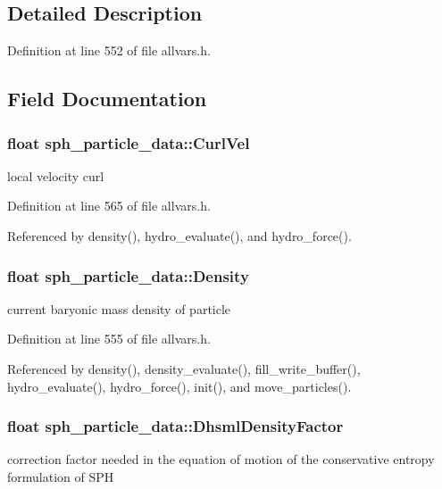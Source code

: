 \subsection{Detailed Description}


Definition at line 552 of file allvars.h.



\subsection{Field Documentation}
\hypertarget{structsph__particle__data_a843c827a50c8783218cd850925deb575}{
\subsubsection[{CurlVel}]{\setlength{\rightskip}{0pt plus 5cm}float {\bf sph\_\-particle\_\-data::CurlVel}}}
\label{structsph__particle__data_a843c827a50c8783218cd850925deb575}
local velocity curl 

Definition at line 565 of file allvars.h.



Referenced by density(), hydro\_\-evaluate(), and hydro\_\-force().

\hypertarget{structsph__particle__data_aaeca7f3efec44ebd5b7d36ce79d38779}{
\subsubsection[{Density}]{\setlength{\rightskip}{0pt plus 5cm}float {\bf sph\_\-particle\_\-data::Density}}}
\label{structsph__particle__data_aaeca7f3efec44ebd5b7d36ce79d38779}
current baryonic mass density of particle 

Definition at line 555 of file allvars.h.



Referenced by density(), density\_\-evaluate(), fill\_\-write\_\-buffer(), hydro\_\-evaluate(), hydro\_\-force(), init(), and move\_\-particles().

\hypertarget{structsph__particle__data_af49cca403dc402fdb0d0d481d49d7b53}{
\subsubsection[{DhsmlDensityFactor}]{\setlength{\rightskip}{0pt plus 5cm}float {\bf sph\_\-particle\_\-data::DhsmlDensityFactor}}}
\label{structsph__particle__data_af49cca403dc402fdb0d0d481d49d7b53}
correction factor needed in the equation of motion of the conservative entropy formulation of SPH 

